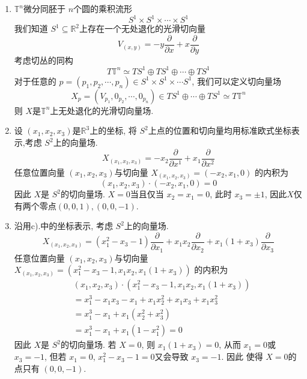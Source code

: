 \documentclass[../main.tex]{subfiles}
\begin{document}
\begin{solution}
\begin{enumerate}
 
        
        \item[b).] \(  \mathbb{T}^{n}  \)微分同胚于 \(  n  \)个圆的乘积流形 \[
        S^{1}\times S^{1}\times \cdots \times S^{1}
        \]  我们知道 \(  S^{1}\subseteq \mathbb{R} ^{2}  \)上存在一个无处退化的光滑切向量 \[
        V_{\left( x,y \right) }= -y\frac{\partial }{\partial x}+ x\frac{\partial }{\partial y}
        \] 考虑切丛的同构 \[
        T \mathbb{T}^{n}\simeq TS^{1}\oplus TS^{1}\oplus \cdots \oplus TS^{1}
        \]对于任意的 \(  p= \left( p_1,p_2,\cdots ,p_{n} \right)\in S^{1}\times S^{1}\times \cdots S^{1}   \),  我们可以定义切向量场 \[
        X_{p}= \left( V_{p_1},0_{p_2},\cdots ,0_{p_{n}} \right) \in TS^{1}\oplus \cdots \oplus TS^{1}\simeq T \mathbb{T}^{n}
        \]则 \(  X  \)是\(  \mathbb{T}^{n}  \)上无处退化的光滑切向量场.  
       \item [c).]设 \(  \left( x_1,x_2,x_3 \right)   \)是\(  \mathbb{R} ^{3}  \)上的坐标, 将 \(  S^{2}  \)上点的位置和切向量均用标准欧式坐标表示,考虑 \(  S^{2}  \)上的向量场.    \[
        X_{\left( x_1,x_2,x_3 \right) }= -x_2\frac{\partial }{\partial x^{1}}+ x_1\frac{\partial }{\partial x^{2}}
        \]任意位置向量 \(  \left( x_1,x_2,x_3 \right)   \)与切向量 \(  X_{\left( x_1,x_2,x_3 \right) }= \left( -x_2,x_1,0 \right)   \)    的内积为 \[
        \left( x_1,x_2,x_3 \right)\cdot \left( -x_2,x_1,0 \right)= 0  
        \]因此 \(  X  \)是 \(  S^{2}  \)的切向量场.   \(  X= 0  \)当且仅当 \(  x_2= x_1= 0  \), 此时 \(  x_{3}= \pm  1 \), 因此\(  X  \)仅有两个零点\(  \left( 0,0,1 \right) , \left( 0,0,-1 \right)   \). 
        \item[d).]   沿用c).中的坐标表示, 考虑 \(  S^{2}  \)上的向量场.    \[
        X_{\left( x_1,x_2,x_3 \right) }= \left( x_1^{2}-x_3-1 \right)\frac{\partial }{\partial x_1}+ x_1x_2\frac{\partial }{\partial x_2}+ x_1\left( 1+ x_3 \right)\frac{\partial }{\partial x_3}  
        \]任意位置向量 \(  \left( x_1,x_2,x_3 \right)   \)与切向量 \(  X_{\left( x_1,x_2,x_3 \right) }= (x_1^2 - x_3 - 1, x_1x_2, x_1(1+x_3))  \)    的内积为 \[
       \begin{aligned}
        &\left( x_1,x_2,x_3 \right)\cdot (x_1^2 - x_3 - 1, x_1x_2, x_1(1+x_3)) \\ 
         &= x_1^{3}-x_1x_3-x_1+ x_1x_2^{2}+ x_1x_3+ x_1x_3^{2}\\ 
          &= x_1^{3}-x_1+  x_1\left( x_2^{2}+ x_3^{2} \right)\\ 
           &= x_1^{3}-x_1+ x_1\left( 1-x_1^{2} \right)= 0  
       \end{aligned} 
        \]因此 \(  X  \)是 \(  S^{2}  \)的切向量场.  若 \(  X= 0  \), 则 \(  x_1\left( 1+ x_3 \right)= 0   \), 从而 \(  x_1= 0  \)或 \(  x_3= -1  \), 但若 \(  x_1= 0  \), \(  x_1^{2}-x_3-1= 0  \)又会导致 \(  x_3= -1  \). 因此 使得 \(  X= 0  \)的点只有 \(  \left( 0,0,-1 \right)   \).        
    \end{enumerate}
    
\end{solution}
\end{document}
